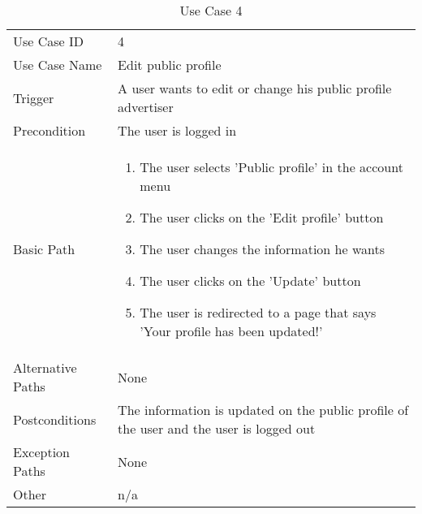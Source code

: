 \begin{table}[H]
\centering
\label{table-use-case-4}
\begin{tabular}{|p{3cm}|p{10cm}}
Use Case ID       & 4                                                           
\\
Use Case Name     & Edit public profile                                                        
\\
Trigger           & A user wants to edit or change his public profile
advertiser
\\
Precondition      & The user is logged in
\\
Basic Path        & \begin{enumerate}

\item The user selects 'Public profile' in the account menu
\item The user clicks on the 'Edit profile' button
\item The user changes the information he wants
\item The user clicks on the 'Update' button
\item The user is redirected to a page that says 'Your profile has been
updated!'
\end{enumerate} 
     \\
Alternative Paths & None                       
\\
Postconditions    & The information is updated on the public profile of the user and the user is logged out
\\
Exception Paths   & None                          \\
Other             & n/a                                                                                                                                                                                                        
\end{tabular}
\caption{Use Case 4}
\end{table}

